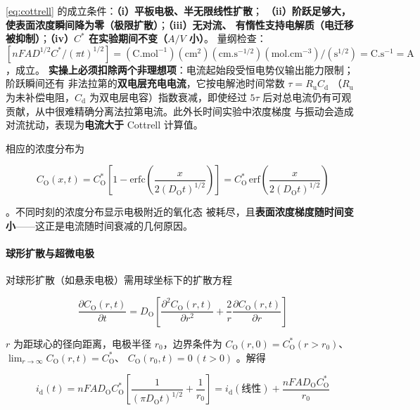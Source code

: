 \begin{keycond}
\eqref{eq:cottrell} 的成立条件：\textbf{（i）平板电极、半无限线性扩散}；
\textbf{（ii）阶跃足够大，使表面浓度瞬间降为零（极限扩散）}；\textbf{（iii）无对流、
有惰性支持电解质（电迁移被抑制）}；\textbf{（iv）$C^*$ 在实验期间不变（$A/V$ 小）}。
量纲检查：$[nFAD^{1/2}C^*/(\pi t)^{1/2}]
=(\mathrm{C.mol^{-1}})(\mathrm{cm^2})(\mathrm{cm.s^{-1/2}})(\mathrm{mol.cm^{-3}})
/(\mathrm{s^{1/2}})=\mathrm{C.s^{-1}}=\mathrm{A}$，成立。
\textbf{实操上必须扣除两个非理想项}：电流起始段受恒电势仪输出能力限制；阶跃瞬间还有
非法拉第的\textbf{双电层充电电流}，它按电解池时间常数 $\tau=R_{\mathrm{u}}C_{\mathrm{d}}$
（$R_{\mathrm{u}}$ 为未补偿电阻，$C_{\mathrm{d}}$ 为双电层电容）指数衰减，即使经过
$5\tau$ 后对总电流仍有可观贡献，从中很难精确分离法拉第电流。此外长时间实验中浓度梯度
与振动会造成对流扰动，表现为\textbf{电流大于} Cottrell 计算值。
\end{keycond}

相应的浓度分布为

\begin{equation}
C_{\mathrm{O}}(x,t)=C_{\mathrm{O}}^*\left[1-\mathrm{erfc}
\left(\frac{x}{2(D_{\mathrm{O}}t)^{1/2}}\right)\right]
=C_{\mathrm{O}}^*\,\mathrm{erf}\!\left(\frac{x}{2(D_{\mathrm{O}}t)^{1/2}}\right)
\label{eq:conc-profile}
\end{equation}

。不同时刻的浓度分布显示电极附近的氧化态
被耗尽，且\textbf{表面浓度梯度随时间变小}——这正是电流随时间衰减的几何原因。

\paragraph{球形扩散与超微电极} 对球形扩散（如悬汞电极）需用球坐标下的扩散方程

\begin{equation}
\frac{\partial C_{\mathrm{O}}(r,t)}{\partial t}
=D_{\mathrm{O}}\left[\frac{\partial^2 C_{\mathrm{O}}(r,t)}{\partial r^2}
+\frac{2}{r}\frac{\partial C_{\mathrm{O}}(r,t)}{\partial r}\right]
\label{eq:fick2-sph}
\end{equation}

$r$ 为距球心的径向距离，电极半径 $r_0$，边界条件为
$C_{\mathrm{O}}(r,0)=C_{\mathrm{O}}^*(r>r_0)$、
$\lim_{r\to\infty}C_{\mathrm{O}}(r,t)=C_{\mathrm{O}}^*$、
$C_{\mathrm{O}}(r_0,t)=0\,(t>0)$ 。解得

\begin{equation}
i_{\mathrm{d}}(t)=nFAD_{\mathrm{O}}C_{\mathrm{O}}^*
\left[\frac{1}{(\pi D_{\mathrm{O}}t)^{1/2}}+\frac{1}{r_0}\right]
=i_{\mathrm{d}}(\text{线性})+\frac{nFAD_{\mathrm{O}}C_{\mathrm{O}}^*}{r_0}
\label{eq:spherical}
\end{equation}

